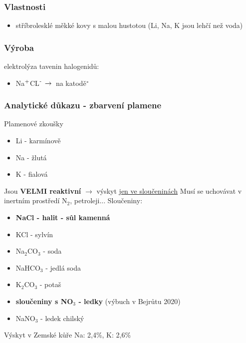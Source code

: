 \documentclass{article}
\def\SP#1{\textsuperscript{#1}}
\begin{document}
    \subsubsection{Vlastnosti}
        \begin{itemize}
            \item stříbrolesklé měkké kovy s malou hustotou (Li, Na, K jsou lehčí než voda)
        \end{itemize}
    \subsubsection{Výroba}
        elektrolýza tavenin halogenidů:
        \begin{itemize}
            \item Na$\SP{+}$CL$\SP{-}\,\to\,$ na katodě$\SP{\textbf{-}}$
        \end{itemize}
    \subsubsection{Analytické důkazu - zbarvení plamene}
        Plamenové zkoušky
        \begin{itemize}
            \item Li - karmínově
            \item Na - žlutá
            \item K - fialová
        \end{itemize}
    Jsou \textbf{VELMI reaktivní} $\rightarrow$ výskyt \underline{jen ve sloučeninách}
    Musí se uchovávat v inertním prostředí N$_2$, petroleji...
    Sloučeniny:
    \begin{itemize}
        \item \textbf{NaCl - halit - sůl kamenná}
        \item KCl - sylvín
        \item Na$_2$CO$_3$ - soda
        \item NaHCO$_3$ - jedlá soda
        \item K$_2$CO$_3$ - potaš
        \item \textbf{sloučeniny s NO$_3$ - ledky} (výbuch v Bejrůtu 2020)
        \item NaNO$_3$ - ledek chilský
    \end{itemize}
    Výskyt v Zemské kůře Na: 2,4\%, K: 2,6\%
    
\end{document}
